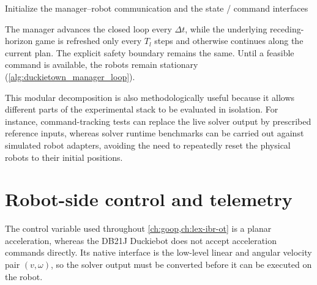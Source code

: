 \begin{algorithm}
\medskip
Initialize the manager--robot communication and the state / command interfaces\;
\caption{Closed-loop manager cycle in the DB21J Duckietown validation stack.}
\label{alg:duckietown_manager_loop}
\end{algorithm}

The manager advances the closed loop every \(\Delta t\), while the underlying receding-horizon
game is refreshed only every \(T_l\) steps and otherwise continues along the current plan.
The explicit safety boundary remains the same. Until a feasible command is available, the robots remain
stationary (\cref{alg:duckietown_manager_loop}).

This modular decomposition is also methodologically useful because it allows different parts of the
experimental stack to be evaluated in isolation.
For instance, command-tracking tests can replace the live solver output by prescribed reference inputs,
whereas solver runtime benchmarks can be carried out against simulated robot adapters, avoiding the need to
repeatedly reset the physical robots to their initial positions.

\section{Robot-side control and telemetry}
\label{sec:duckietown-control}

The control variable used throughout \cref{ch:goop,ch:lex-ibr-ot} is a planar
acceleration, whereas the DB21J Duckiebot does not accept acceleration commands directly.
Its native interface is the low-level linear and angular velocity pair \((v,\omega)\), so the solver output
must be converted before it can be executed on the robot.


